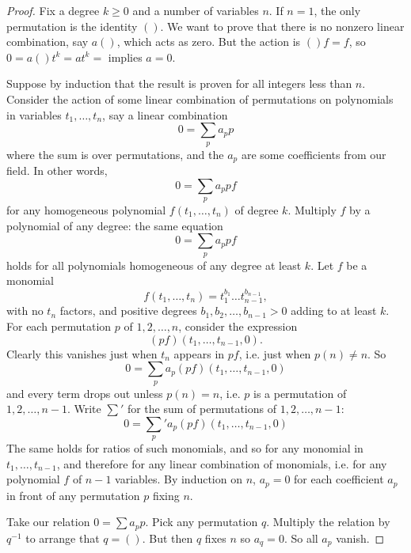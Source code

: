\begin{proof}
Fix a degree \(k\ge 0\) and a number of variables \(n\).
If \(n=1\), the only permutation is the identity \(()\).
We want to prove that there is no nonzero linear combination, say \(a()\), which acts as zero.
But the action is \(()f=f\), so \(0=a()t^k=at^k=\) implies \(a=0\).

Suppose by induction that the result is proven for all integers less than \(n\).
Consider the action of some linear combination of permutations on polynomials in variables \(t_1,\dots,t_n\), say a linear combination 
\[
0 = \sum_p a_p p
\]
where the sum is over permutations, and the \(a_p\) are some coefficients from our field.
In other words,
\[
0 = \sum_p a_p pf
\]
for any homogeneous polynomial \(f(t_1,\dots,t_n)\) of degree \(k\).
Multiply \(f\) by a polynomial of any degree: the same equation
\[
0 = \sum_p a_p pf
\]
holds for all polynomials homogeneous of any degree at least \(k\).
Let \(f\) be a monomial
\[
f(t_1,\dots,t_n)=t_1^{b_1}\dots t_{n-1}^{b_{n-1}},
\]
with no \(t_n\) factors, and positive degrees \(b_1,b_2,\dots,b_{n-1}>0\) adding to at least \(k\).
For each permutation \(p\) of \(1,2,\dots,n\), consider the expression
\[
(pf)(t_1,\dots,t_{n-1},0).
\]
Clearly this vanishes just when \(t_n\) appears in \(pf\), i.e. just when \(p(n)\ne n\).
So
\[
0 = \sum_p a_p (pf)(t_1,\dots,t_{n-1},0)
\]
and every term drops out unless \(p(n)=n\), i.e. \(p\) is a permutation of \(1,2,\dots,n-1\).
Write \(\sum'\) for the sum of permutations of \(1,2,\dots,n-1\):
\[
0 = {\sum_p}' a_p (pf)(t_1,\dots,t_{n-1},0)
\]
The same holds for ratios of such monomials, and so for any monomial in \(t_1,\dots,t_{n-1}\), and therefore for any linear combination of monomials, i.e. for any polynomial \(f\) of \(n-1\) variables.
By induction on \(n\), \(a_p=0\) for each coefficient \(a_p\) in front of any permutation \(p\) fixing \(n\).

Take our relation \(0 = \sum a_p p\).
Pick any permutation \(q\).
Multiply the relation by \(q^{-1}\) to arrange that \(q=()\).
But then \(q\) fixes \(n\) so \(a_q=0\).
So all \(a_p\) vanish.
\end{proof}


